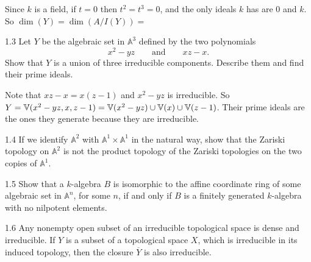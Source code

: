 \documentclass[12pt]{article}
\begin{document}
\begin{solution}
    \bbni
    
    Since $k$ is a field, if $t = 0$ then $t^2 = t^3 = 0$, and the only ideals $k$ has are $0$ and $k$. So $\dim(Y) = \dim(A/I (Y)) = $
\end{solution}

\begin{problem}{1.3}
    Let $Y$ be the algebraic set in $\mathbb A^3$ defined by the two polynomials
    \[
    x^2-yz
    \qquad\text{and}\qquad
    xz-x.
    \]
    Show that $Y$ is a union of three irreducible components. Describe them and find their prime ideals.
\end{problem}

\begin{solution}
    \bbni
    Note that $xz -x = x(z -1)$ and $x^2 -yz$ is irreducible. So 
    $Y = \mathbb V(x^2 - yz, x, z-1)  = \mathbb V(x^2- yz) \cup \mathbb V(x) \cup \mathbb V(z-1)$. Their prime ideals are the ones they generate because they are irreducible. 
\end{solution}

\begin{problem}{1.4}
    If we identify $\mathbb A^2$ with $\mathbb A^1\times\mathbb A^1$ in the natural way, show that the Zariski topology on $\mathbb A^2$ is not the product topology of the Zariski topologies on the two copies of $\mathbb A^1$.
\end{problem}

\begin{solution}
    \bbni


\end{solution}

\begin{problem}{1.5}
Show that a $k$-algebra $B$ is isomorphic to the affine coordinate ring of some algebraic set in $\mathbb A^n$, for some $n$, if and only if $B$ is a finitely generated $k$-algebra with no nilpotent elements.
\end{problem}

\begin{problem}{1.6}
Any nonempty open subset of an irreducible topological space is dense and irreducible. If $Y$ is a subset of a topological space $X$, which is irreducible in its induced topology, then the closure $\overline{Y}$ is also irreducible.
\end{problem}
\end{document}
